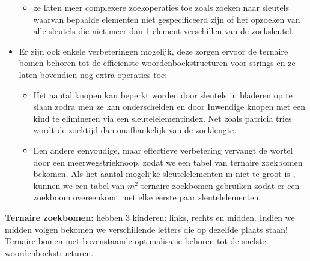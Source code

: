 \begin{itemize}
\begin{itemize}
\item ze laten meer complexere zoekoperaties toe zoals zoeken naar sleutels waarvan bepaalde elementen niet gespecificeerd zijn of het opzoeken van alle sleutels die niet meer dan 1 element verschillen van de zoeksleutel.
\end{itemize}
\clearpage
\item Er zijn ook enkele verbeteringen mogelijk, deze zorgen ervoor de ternaire bomen behoren tot de effici\"enste woordenboekstructuren voor strings en ze laten bovendien nog extra operaties toe:
\begin{itemize}
\item Het aantal knopen kan beperkt worden door sleutels in bladeren op te slaan zodra men ze kan onderscheiden en door Inwendige knopen met een kind te elimineren via een sleutelelementindex. Net zoals patricia tries wordt de zoektijd dan onafhankelijk van de zoeklengte.
\item Een andere eenvoudige, maar effectieve verbetering vervangt de wortel door een meerwegstrieknoop, zodat we een tabel van ternaire zoekbomen bekomen. Als het aantal mogelijke sleutelelementen m niet te groot is , kunnen we een tabel van $m^{2}$ ternaire zoekbomen gebruiken zodat er een zoekboom overeenkomt met elke eerste paar sleutelelementen.
\end{itemize}
\end{itemize}

\begin{mdframed}[leftmargin=10pt,rightmargin=10pt]
\textbf{Ternaire zoekbomen:} hebben 3 kinderen: links, rechts en midden. Indien we midden volgen bekomen we verschillende letters die op dezelfde plaats staan! Ternaire bomen met bovenstaande optimalisatie behoren tot de snelste woordenboekstructuren.
\end{mdframed}